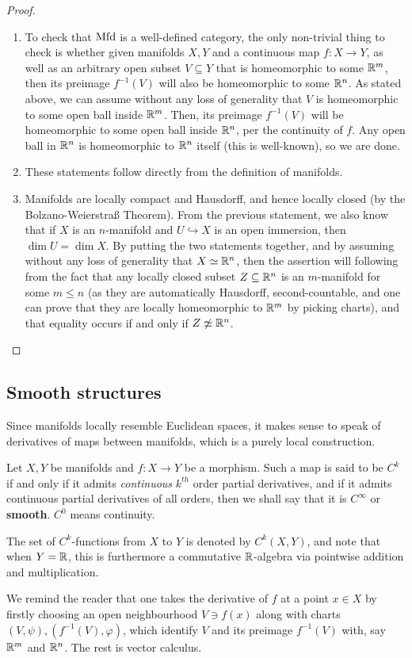             \begin{proof}
                \begin{enumerate}
                    \item To check that $\mathrm{Mfd}$ is a well-defined category, the only non-trivial thing to check is whether given manifolds $X, Y$ and a continuous map $f: X \to Y$, as well as an arbitrary open subset $V \subseteq Y$ that is homeomorphic to some $\mathbb{R}^m$, then its preimage $f^{-1}(V)$ will also be homeomorphic to some $\mathbb{R}^n$. As stated above, we can assume without any loss of generality that $V$ is homeomorphic to some open ball inside $\mathbb{R}^m$. Then, its preimage $f^{-1}(V)$ will be homeomorphic to some open ball inside $\mathbb{R}^n$, per the continuity of $f$. Any open ball in $\mathbb{R}^n$ is homeomorphic to $\mathbb{R}^n$ itself (this is well-known), so we are done.
                    \item These statements follow directly from the definition of manifolds.
                    \item Manifolds are locally compact and Hausdorff, and hence locally closed (by the Bolzano-Weierstra{\ss} Theorem). From the previous statement, we also know that if $X$ is an $n$-manifold and $U \hookrightarrow  X$ is an open immersion, then $\dim U = \dim X$. By putting the two statements together, and by assuming without any loss of generality that $X \simeq \mathbb{R}^n$, then the assertion will following from the fact that any locally closed subset $Z \subseteq \mathbb{R}^n$ is an $m$-manifold for some $m \leq n$ (as they are automatically Hausdorff, second-countable, and one can prove that they are locally homeomorphic to $\mathbb{R}^m$ by picking charts), and that equality occurs if and only if $Z \not \simeq \mathbb{R}^n$.
                \end{enumerate}
            \end{proof}

    \subsection{Smooth structures}
        Since manifolds locally resemble Euclidean spaces, it makes sense to speak of derivatives of maps between manifolds, which is a purely local construction.
        \begin{definition}[$C^k$-functions] \label{def: C_k_functions}
            Let $X, Y$ be manifolds and $f: X \to Y$ be a morphism. Such a map is said to be $C^k$ if and only if it admits \textit{continuous} $k^{th}$ order partial derivatives, and if it admits continuous partial derivatives of all orders, then we shall say that it is $C^{\infty}$ or \textbf{smooth}. $C^0$ means continuity.

            The set of $C^k$-functions from $X$ to $Y$ is denoted by $C^k(X, Y)$, and note that when $Y = \mathbb{R}$, this is furthermore a commutative $\mathbb{R}$-algebra via pointwise addition and multiplication.
        \end{definition}
        We remind the reader that one takes the derivative of $f$ at a point $x \in X$ by firstly choosing an open neighbourhood $V \ni f(x)$ along with charts $(V, \psi), (f^{-1}(V), \varphi)$, which identify $V$ and its preimage $f^{-1}(V)$ with, say $\mathbb{R}^m$ and $\mathbb{R}^n$. The rest is vector calculus.

